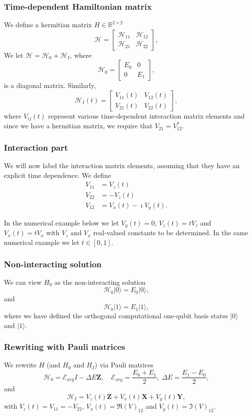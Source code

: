 \documentclass{beamer}
\begin{document}
\begin{frame}
\frametitle{Time-dependent Hamiltonian matrix}

We define a  hermitian  matrix  $H\in {\mathbb{R}}^{2\times 2}$
\[
\mathcal{H} = \begin{bmatrix} \mathcal{H}_{11} & \mathcal{H}_{12} \\ \mathcal{H}_{21} & \mathcal{H}_{22}
\end{bmatrix},
\]
We  let $\mathcal{H} = \mathcal{H}_0 + \mathcal{H}_I$, where
\[
\mathcal{H}_0= \begin{bmatrix} E_0 & 0 \\ 0 & E_1\end{bmatrix},
\]
is a diagonal matrix. Similarly,
\[
\mathcal{H}_I(t)= \begin{bmatrix} V_{11}(t) & V_{12}(t) \\ V_{21}(t) & V_{22}(t)\end{bmatrix},
\]
where $V_{ij}(t)$ represent various time-dependent interaction matrix elements and since we have a hermitian matrix, we require that
$V_{21}=V_{12}^*$.
\end{frame}

\begin{frame}
\frametitle{Interaction part}

We will now label  the interaction matrix elements, assuming that they have an explicit time dependence.
We define
\begin{align*}
V_{11} & = V_z(t)\\
V_{22} & = -V_z(t)\\
V_{12} & = V_x(t)-\imath V_y(t).
\end{align*}

In the numerical example below we let $V_y(t)=0$, $V_z(t) = tV_z$
and $V_x(t) = tV_x$ with $V_z$ and $V_x$ real-valued constants to
be determined. In the same numerical example we let $t\in [0,1]$.
\end{frame}

\begin{frame}
\frametitle{Non-interacting solution}

We can view $H_0$ as the non-interacting solution
\[
       \mathcal{H}_0\vert 0 \rangle =E_0\vert 0 \rangle,
\]
and
\[
       \mathcal{H}_0\vert 1\rangle =E_1\vert 1\rangle,
\]
where we have defined the orthogonal computational one-qubit basis states $\vert 0\rangle$ and $\vert 1\rangle$.
\end{frame}

\begin{frame}
\frametitle{Rewriting with Pauli matrices}

We rewrite $H$ (and $H_0$ and $H_I$)  via Pauli matrices
\[
\mathcal{H}_0 = \mathcal{E}_{\mathrm{avg}} I -\Delta E \bm{Z}, \quad \mathcal{E}_{\mathrm{avg}} = \frac{E_0
  + E_1}{2}, \; \Delta E = \frac{E_1-E_0}{2},
\]
and
\[
\mathcal{H}_I = V_z(t)\bm{Z} + V_x(t)\bm{X}+V_y(t)\bm{Y},
\]
with $V_z(t) = V_{11}=-V_{22}$, $V_x(t) = \Re (V)_{12}$ and $V_y(t) = \Im (V)_{12}$.
\end{frame}
\end{document}
